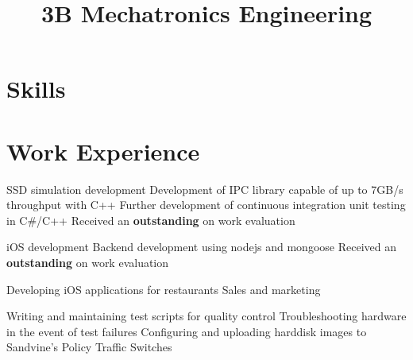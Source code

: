 \documentclass[11pt,a4paper]{moderncv}
\title{3B Mechatronics Engineering}               %
\begin{document}
\maketitle

\vspace{-13mm}

\section{Skills}


\section{Work Experience}
{SSD simulation development
    \newline{}Development of IPC library capable of up to 7GB/s throughput with C++
    \newline{}Further development of continuous integration unit testing in C#/C++
\newline{}Received an \textbf{outstanding} on work evaluation}

{iOS development
    \newline{}Backend development using nodejs and mongoose
\newline{}Received an \textbf{outstanding} on work evaluation}

{Developing iOS applications for restaurants
\newline{} Sales and marketing \newline{}}

{Writing and maintaining test scripts for quality control
    \newline{}Troubleshooting hardware in the event of test failures
\newline{}Configuring and uploading harddisk images to Sandvine's Policy Traffic Switches\newline{}}
\end{document}
